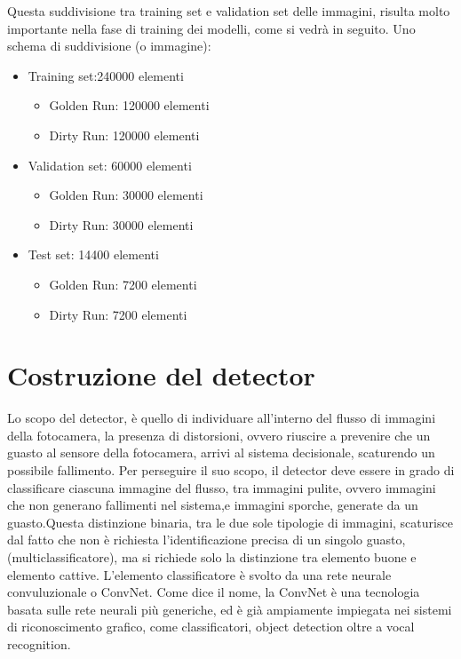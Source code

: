 \documentclass[14pt]{extarticle}
\begin{document}
Questa suddivisione tra training set e validation set delle immagini, risulta molto importante nella fase di training dei modelli, come si vedrà in seguito.
Uno schema di suddivisione (o immagine):
\begin{itemize}
\item Training set:240000 elementi
\begin{itemize}
\item Golden Run: 120000 elementi
\item Dirty Run: 120000 elementi
\end{itemize}
\item Validation set: 60000 elementi
\begin{itemize}
\item Golden Run: 30000 elementi
\item Dirty Run: 30000 elementi
\end{itemize}
\item Test set: 14400 elementi
\begin{itemize}
\item Golden Run: 7200 elementi
\item Dirty Run: 7200 elementi
\end{itemize}
\end{itemize}

\section{Costruzione del detector}
Lo scopo del detector, è quello di individuare all'interno del flusso di immagini della fotocamera, la presenza di distorsioni, ovvero riuscire a prevenire che un guasto al sensore della fotocamera, arrivi al sistema decisionale, scaturendo un possibile fallimento. Per perseguire il suo scopo, il detector deve essere in grado di classificare ciascuna immagine del flusso, tra immagini pulite, ovvero immagini che non generano fallimenti nel sistema,e immagini sporche, generate da un guasto.Questa distinzione binaria, tra le due sole tipologie di immagini, scaturisce dal fatto che non è richiesta l'identificazione precisa di un singolo guasto,(multiclassificatore), ma si richiede solo la distinzione tra elemento buone e elemento cattive.
L'elemento classificatore è svolto da una rete neurale convuluzionale o ConvNet.
Come dice il nome, la  ConvNet è  una tecnologia basata sulle rete neurali più generiche, ed è già ampiamente impiegata nei sistemi di riconoscimento grafico, come classificatori, object detection oltre a vocal recognition.
\end{document}

